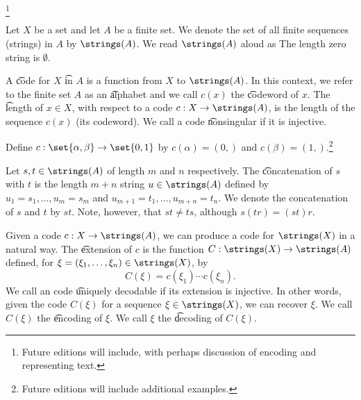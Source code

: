 
\footnote{Future editions will include, with perhaps discussion of encoding and representing text.}


Let $X$ be a set and let $A$ be a finite set.
We denote the set of all finite sequences (strings) in $A$ by $\strings(A)$.
We read $\strings(A)$ aloud as 
The length zero string is $\emptyset$.

A \t{code} for $X$ \t{in} $A$ is a function from $X$ to $\strings(A)$.
In this context, we refer to the finite set $A$ as an \t{alphabet} and we call $c(x)$ the \t{codeword} of $x$.
The \t{length} of $x \in X$, with respect to a code $c: X \to \strings(A)$, is the length of the sequence $c(x)$ (its codeword).
We call a code \t{nonsingular} if it is injective.


Define $c: \set{\alpha, \beta} \to \set{0, 1}$ by $c(\alpha) = (0,)$ and $c(\beta) = (1,)$.\footnote{Future editions will include additional examples.}



Let $s,t \in \strings(A)$ of length $m$  and $n$ respectively.
The \t{concatenation} of $s$ with $t$ is the length $m+n$ string $u \in \strings(A)$ defined by $u_{1} = s_1, \dots, u_m = s_m$ and $u_{m+1} = t_1, \dots, u_{m+n} = t_n$.
We denote the concatenation of $s$ and $t$ by $st$.
Note, however, that $st \neq ts$, although $s(tr) = (st)r$.

Given a code $c: X \to \strings(A)$, we can produce a code for $\strings(X)$ in a natural way.
The \t{extension} of $c$ is the function $C: \strings(X) \to \strings(A)$ defined, for $\xi = (\xi_1, \dots, \xi_n) \in \strings(X)$, by
\[
  C(\xi) = c(\xi_1) \cdots c(\xi_n).
\]
We call an code \t{uniquely decodable} if its extension is injective.
In other words, given the code $C(\xi)$ for a sequence $\xi \in \strings(X)$, we can recover $\xi$.
We call $C(\xi)$ the \t{encoding} of $\xi$.
We call $\xi$ the \t{decoding} of $C(\xi)$.

